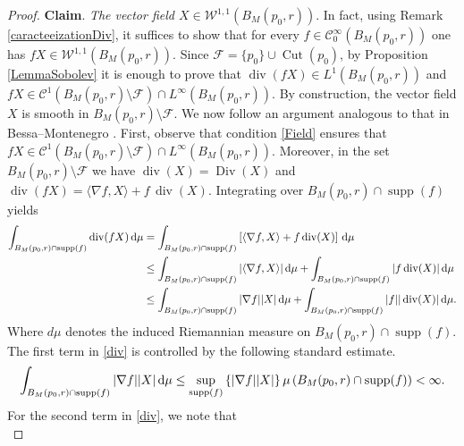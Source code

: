 \documentclass{article}
\begin{document}
\begin{proof}
\medskip
\noindent\textbf{Claim}. \textit{The vector field $X \in \mathcal{W}^{1,1}(B_M(p_0,r))$}. In fact, using Remark \ref{caracteeizationDiv}, it suffices to show that for every $f \in \mathcal{C}_0^{\infty}(B_M(p_0,r))$ one has $fX \in \mathcal{W}^{1,1}(B_M(p_0,r))$. Since $\mathcal{F} = \{p_0\} \cup \operatorname{Cut}(p_0)$, by Proposition \ref{LemmaSobolev} it is enough to prove that $\operatorname{div}(fX) \in L^{1}(B_M(p_0,r))$ and $fX \in \mathcal{C}^1(B_M(p_0,r)\setminus \mathcal{F}) \cap L^{\infty}(B_M(p_0,r))$. By construction, the vector field $X$ is smooth in $B_M(p_0,r)\setminus \mathcal{F}$. We now follow an argument analogous to that in Bessa--Montenegro \cite{BessaMontenegro}. First, observe that condition \eqref{Field} ensures that $fX \in \mathcal{C}^1(B_M(p_0,r)\setminus \mathcal{F}) \cap L^{\infty}(B_M(p_0,r))$. Moreover, in the set $B_M(p_0,r)\setminus \mathcal{F}$ we have $\operatorname{div}(X) = \operatorname{Div}(X)$ and
$\operatorname{div}(fX) = \langle \nabla f, X \rangle + f\,\operatorname{div}(X)$.
Integrating over $B_M(p_0,r)\cap \operatorname{supp}(f)$ yields
\begin{equation}\label{div}
\begin{aligned}
    \int_{B_M(p_0,r)\cap\operatorname{supp}(f)} \operatorname{div}(fX) \, \rm{d}\mu &= \int_{B_M(p_0,r)\cap\operatorname{supp}(f)} \left[ \langle \nabla f, X \rangle + f\operatorname{div}(X) \right] \, \rm{d}\mu \\
    &\leq \int_{B_M(p_0,r)\cap\operatorname{supp}(f)} |\langle \nabla f, X \rangle|  \, {\rm d}\mu + \int_{B_M(p_0,r)\cap\operatorname{supp}(f)} |f \operatorname{div}(X) |  \, \rm{d}\mu \\
    &\leq \int_{B_M(p_0,r)\cap\operatorname{supp}(f)} |\nabla f| |X|  \, {\rm d}\mu + \int_{B_M(p_0,r)\cap\operatorname{supp}(f)} |f| |\operatorname{div}(X)|  \, \rm{d}\mu. 
\end{aligned}
\end{equation}
Where $d\mu$ denotes the induced Riemannian measure on $B_M(p_0,r)\cap \operatorname{supp}(f)$. The first term in \eqref{div} is controlled by the following standard estimate.
\begin{equation}
    \int_{B_M(p_0,r)\cap\operatorname{supp}(f)} |\nabla f||X|  \, {\rm d}\mu \leq \sup_{\operatorname{supp}(f)}\left\{ |\nabla f| |X| \right\}\mu\left( B_M(p_0,r)\cap\operatorname{supp}(f) \right) < \infty.
\end{equation}
For the second term in \eqref{div}, we note that
\begin{equation}\label{div2}

\end{equation}
\end{proof}
\end{document}
